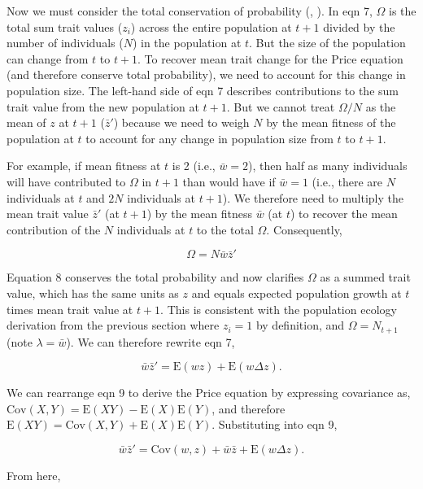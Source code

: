 \documentclass[
]{article}
\begin{document}
Now we must consider the total conservation of probability
(, ).
In eqn 7, \(\Omega\) is the total sum trait values (\(z_{i}\)) across
the entire population at \(t + 1\) divided by the number of individuals
(\(N\)) in the population at \(t\). But the size of the population can
change from \(t\) to \(t + 1\). To recover mean trait change for the
Price equation (and therefore conserve total probability), we need to
account for this change in population size. The left-hand side of eqn 7
describes contributions to the sum trait value from the new population
at \(t + 1\). But we cannot treat \(\Omega/N\) as the mean of \(z\) at
\(t+1\) (\(\bar{z}'\)) because we need to weigh \(N\) by the mean
fitness of the population at \(t\) to account for any change in
population size from \(t\) to \(t+1\).

For example, if mean fitness at \(t\) is 2 (i.e., \(\bar{w} = 2\)), then
half as many individuals will have contributed to \(\Omega\) in
\(t + 1\) than would have if \(\bar{w} = 1\) (i.e., there are \(N\)
individuals at \(t\) and \(2N\) individuals at \(t + 1\)). We therefore
need to multiply the mean trait value \(\bar{z}'\) (at \(t + 1\)) by the
mean fitness \(\bar{w}\) (at \(t\)) to recover the mean contribution of
the \(N\) individuals at \(t\) to the total \(\Omega\). Consequently,

\[\Omega = N\bar{w}\bar{z}'
\tag{8}
\]

Equation 8 conserves the total probability and now clarifies \(\Omega\)
as a summed trait value, which has the same units as \(z\) and equals
expected population growth at \(t\) times mean trait value at \(t + 1\).
This is consistent with the population ecology derivation from the
previous section where \(z_{i} = 1\) by definition, and
\(\Omega = N_{t+1}\) (note \(\lambda = \bar{w}\)). We can therefore
rewrite eqn 7,

\[\bar{w}\bar{z}' = \mathrm{E}\left(w z \right) + \mathrm{E}\left( w \Delta z  \right).
\tag{9}
\]

We can rearrange eqn 9 to derive the Price equation by expressing
covariance as,
\(\mathrm{Cov}(X,Y) = \mathrm{E}(XY) - \mathrm{E}(X)\mathrm{E}(Y)\), and
therefore
\(\mathrm{E}(XY) = \mathrm{Cov}(X,Y) + \mathrm{E}(X)\mathrm{E}(Y)\).
Substituting into eqn 9,

\[\bar{w}\bar{z}' = \mathrm{Cov}\left(w ,z \right) + \bar{w}\bar{z} + \mathrm{E}\left( w \Delta z  \right).\]

From here,
\end{document}
